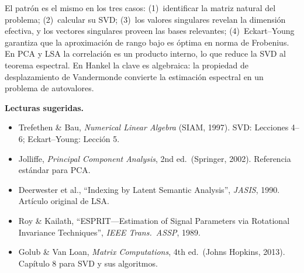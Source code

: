 \documentclass[12pt]{article}
\begin{document}
El patrón es el mismo en los tres casos: (1)~identificar la matriz natural del problema; (2)~calcular su SVD; (3)~los valores singulares revelan la dimensión efectiva, y los vectores singulares proveen las bases relevantes; (4)~Eckart--Young garantiza que la aproximación de rango bajo es óptima en norma de Frobenius. En PCA y LSA la correlación es un producto interno, lo que reduce la SVD al teorema espectral. En Hankel la clave es algebraica: la propiedad de desplazamiento de Vandermonde convierte la estimación espectral en un problema de autovalores.

\bigskip
\hrulefill

\bigskip
\noindent\textbf{Lecturas sugeridas.}
\begin{itemize}
  \item Trefethen \& Bau, \textit{Numerical Linear Algebra} (SIAM, 1997). SVD: Lecciones 4--6; Eckart--Young: Lección 5.
  \item Jolliffe, \textit{Principal Component Analysis}, 2nd ed.\ (Springer, 2002). Referencia estándar para PCA.
  \item Deerwester et al., ``Indexing by Latent Semantic Analysis'', \textit{JASIS}, 1990. Artículo original de LSA.
  \item Roy \& Kailath, ``ESPRIT---Estimation of Signal Parameters via Rotational Invariance Techniques'', \textit{IEEE Trans.~ASSP}, 1989.
  \item Golub \& Van Loan, \textit{Matrix Computations}, 4th ed.\ (Johns Hopkins, 2013). Capítulo 8 para SVD y sus algoritmos.
\end{itemize}
\end{document}
